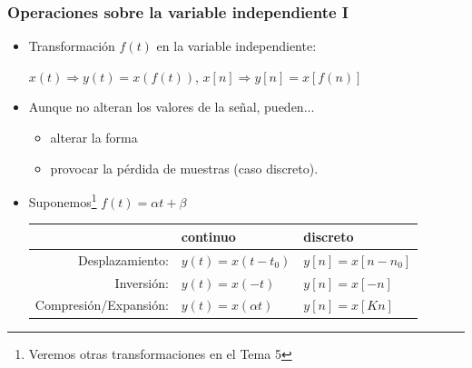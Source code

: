 
\begin{frame}
    \frametitle{Operaciones sobre la variable independiente I}
    \begin{itemize}
        \item Transformación $f(t)$ en la variable independiente:\\
        \vspace{0.1cm}
        \begin{center}
            \color{blue}$x(t)\Rightarrow y(t) = x(f(t))$, \hspace{0.1cm} $x[n] \Rightarrow y[n]=x[f(n)]$\color{black}
        \end{center}
        \vspace{0.1cm}
        \item Aunque no alteran los valores de la señal, pueden... 
        \vspace{0.2cm}
        \begin{itemize}
            \item alterar la forma
            \item provocar la pérdida de muestras (caso discreto).
        \end{itemize}
        \vspace{0.2cm}
        \item Suponemos\footnote{Veremos otras transformaciones en el Tema 5} \color{blue}$f(t)=\alpha t+\beta$\color{black}
        \vspace{0.4cm}

        \begingroup
            \small
            \begin{tabular}{r|ll}
                & continuo & discreto\\\hline
                \color{red}Desplazamiento:\color{black} & $y(t)=x(t-t_0)$ & $y[n]=x[n-n_0]$ \\
                \color{red}Inversión:\color{black} & $y(t)=x(-t)$ & $y[n]=x[-n]$ \\
                \color{red}Compresión/Expansión:\color{black} & $y(t)=x(\alpha t)$ & $y[n]=x[Kn]$ \\
            \end{tabular}
        \endgroup
    \end{itemize}
\end{frame}


